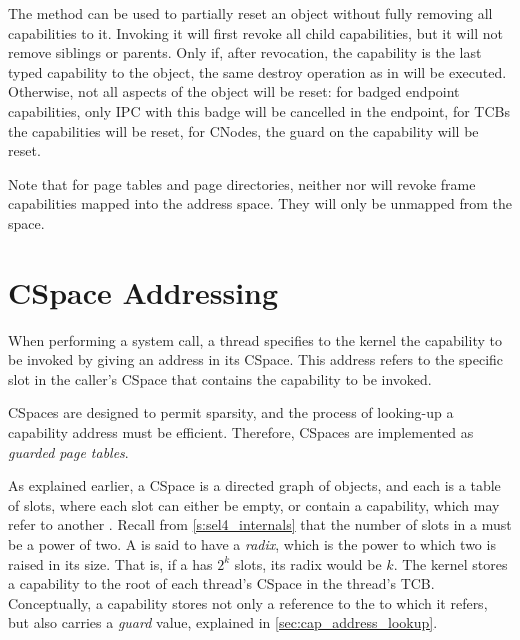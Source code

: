 The  method can be used
to partially reset an object without fully removing all capabilities
to it. Invoking it will first revoke all child capabilities, but it
will not remove siblings or parents. Only if, after revocation, the
capability is the last typed capability to the object, the same
destroy operation as in 
will be executed. Otherwise, not all aspects of the object will be
reset: for badged endpoint capabilities, only IPC with this badge will
be cancelled in the endpoint, for TCBs the capabilities will be reset,
for CNodes, the guard on the capability will be reset.

Note that for page tables and page directories, neither
 nor
 will revoke frame
capabilities mapped into the address space.  They will only be
unmapped from the space.


\section{CSpace Addressing}
\label{s:cspace-addressing}

When performing a system call, a thread specifies to the kernel the
capability to be invoked by giving an address in its CSpace. This
address refers to the specific slot in the caller's CSpace that
contains the capability to be invoked.

CSpaces are designed to permit sparsity, and the process of looking-up
a capability address must be efficient. Therefore, CSpaces are
implemented as \emph{guarded page tables}.

As explained earlier, a CSpace is a directed graph of 
objects, and each  is a table of slots, where each slot can
either be empty, or contain a capability, which may refer to another .
Recall from \autoref{s:sel4_internals} that the number of slots in a 
must be a power of two. A  is said to have a \emph{radix}, which is
the power to which two is raised in its size. That is, if a  has
$2^k$ slots, its radix would be $k$.
The kernel stores a capability to the root  of each thread's
CSpace in the thread's TCB. Conceptually, a  capability
stores not only a reference to the  to which it refers, but
also carries a \emph{guard} value, explained in
\autoref{sec:cap_address_lookup}.

